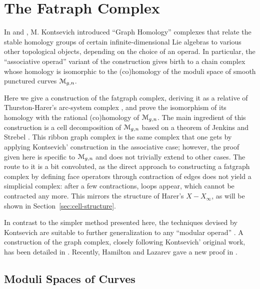 

\chapter{The Fatraph Complex}
\label{cha:ribbon-graph-complex}

In \cite{kontsevich;1993} and \cite{kontsevich;feynman}, M. Kontsevich
introduced ``Graph Homology'' complexes that relate the stable
homology groups of certain infinite-dimensional Lie algebras to
various other topological objects, depending on the choice of an
operad.  In particular, the ``associative operad'' variant of the
construction gives birth to a chain complex whose homology is
isomorphic to the (co)homology of the moduli space of smooth punctured
curves $\mathcal{M}_{g,n}$.

Here we give a construction of the fatgraph complex, deriving it
as a relative of Thurston-Harer's arc-system complex \cite{%
  harer;cohomological-dimension,%
  harer;cohomology-of-moduli%
},
and prove the isomorphism of its homology with the
rational (co)homology of $\mathcal{M}_{g,n}$.  The main ingredient of this
construction is a cell decomposition of $\mathcal{M}_{g,n}$ based on a theorem
of Jenkins and Strebel \cite{strebel;quadratic-differentials;1983}.
This ribbon graph complex is the same complex that one gets by
applying Kontsevich' construction in the associative case; however,
the proof given here is specific to $\mathcal{M}_{g,n}$ and does not trivially
extend to other cases.  The route to it is a bit convoluted, as the
direct approach to constructing a fatgraph complex by defining
face operators through contraction of edges does not yield a
simplicial complex: after a few contractions, loops appear, which
cannot be contracted any more.  This mirrors the structure of Harer's
$X - X_\infty$, as will be shown in Section~\ref{sec:cell-structure}.

In contrast to the simpler method presented here, the techniques
devised by Kontsevich are suitable to further generalization to any
``modular operad'' \cite{getzler-kapranov}.  A construction of the
graph complex, closely following Kontsevich' original work, has been
detailed in \cite{conant-vogtmann;2003}. Recently, Hamilton and
Lazarev gave a new proof in \cite{hamilton-lazarev;math.QA/0608395}.




\section{Moduli Spaces of Curves}
\label{sec:moduli-spaces}


